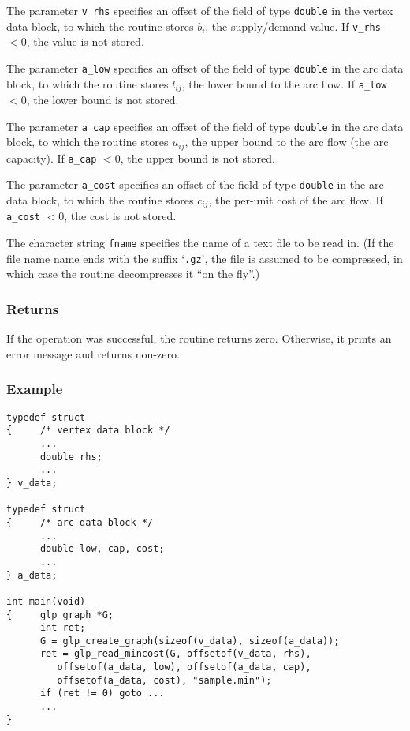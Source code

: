 The parameter \verb|v_rhs| specifies an offset of the field of type
\verb|double| in the vertex data block, to which the routine stores
$b_i$, the supply/demand value. If \verb|v_rhs| $<0$, the value is not
stored.

The parameter \verb|a_low| specifies an offset of the field of type
\verb|double| in the arc data block, to which the routine stores
$l_{ij}$, the lower bound to the arc flow. If \verb|a_low| $<0$, the
lower bound is not stored.

The parameter \verb|a_cap| specifies an offset of the field of type
\verb|double| in the arc data block, to which the routine stores
$u_{ij}$, the upper bound to the arc flow (the arc capacity). If
\verb|a_cap| $<0$, the upper bound is not stored.

The parameter \verb|a_cost| specifies an offset of the field of type
\verb|double| in the arc data block, to which the routine stores
$c_{ij}$, the per-unit cost of the arc flow. If \verb|a_cost| $<0$, the
cost is not stored.

The character string \verb|fname| specifies the name of a text file to
be read in. (If the file name name ends with the suffix `\verb|.gz|',
the file is assumed to be compressed, in which case the routine
decompresses it ``on the fly''.)

\subsubsection*{Returns}

If the operation was successful, the routine returns zero. Otherwise,
it prints an error message and returns non-zero.

\subsubsection*{Example}

\begin{verbatim}
typedef struct
{     /* vertex data block */
      ...
      double rhs;
      ...
} v_data;

typedef struct
{     /* arc data block */
      ...
      double low, cap, cost;
      ...
} a_data;

int main(void)
{     glp_graph *G;
      int ret;
      G = glp_create_graph(sizeof(v_data), sizeof(a_data));
      ret = glp_read_mincost(G, offsetof(v_data, rhs),
         offsetof(a_data, low), offsetof(a_data, cap),
         offsetof(a_data, cost), "sample.min");
      if (ret != 0) goto ...
      ...
}
\end{verbatim}

